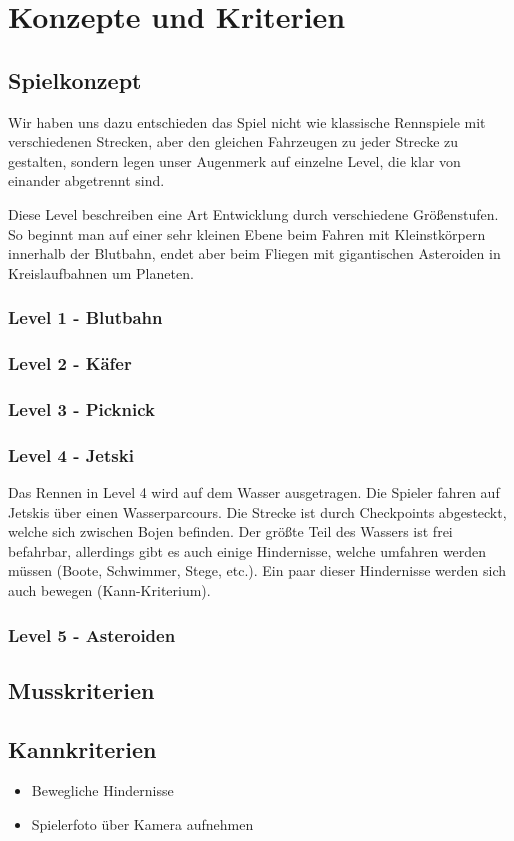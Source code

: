 \section{Konzepte und Kriterien}

\subsection{Spielkonzept}

Wir haben uns dazu entschieden das Spiel nicht wie klassische Rennspiele mit verschiedenen Strecken, aber den gleichen Fahrzeugen zu jeder Strecke zu gestalten, sondern legen unser Augenmerk auf einzelne Level, die klar von einander abgetrennt sind.

Diese Level beschreiben eine Art Entwicklung durch verschiedene Größenstufen.
So beginnt man auf einer sehr kleinen Ebene beim Fahren mit Kleinstkörpern innerhalb der Blutbahn, endet aber beim Fliegen mit gigantischen Asteroiden in Kreislaufbahnen um Planeten.

\subsubsection{Level 1 - Blutbahn}

\subsubsection{Level 2 - Käfer}

\subsubsection{Level 3 - Picknick}

\subsubsection{Level 4 - Jetski}

Das Rennen in Level 4 wird auf dem Wasser ausgetragen. Die Spieler fahren auf Jetskis über einen Wasserparcours. Die Strecke ist durch Checkpoints abgesteckt, welche sich zwischen Bojen befinden. Der größte Teil des Wassers ist frei befahrbar, allerdings gibt es auch einige Hindernisse, welche umfahren werden müssen (Boote, Schwimmer, Stege, etc.). Ein paar dieser Hindernisse werden sich auch bewegen (Kann-Kriterium).

\subsubsection{Level 5 - Asteroiden}

\subsection{Musskriterien}

\subsection{Kannkriterien}

\begin{itemize}
\item Bewegliche Hindernisse
\item Spielerfoto über Kamera aufnehmen
\end{itemize}

